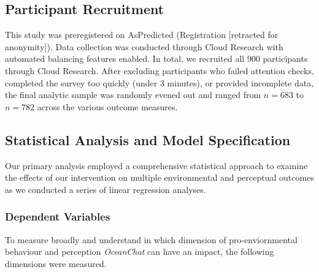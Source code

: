 \documentclass[sigconf, nonacm]{acmart}
\begin{document}
\subsection{Participant Recruitment}
This study was preregistered on AsPredicted (Registration [retracted for anonymity]). Data collection was conducted through Cloud Research with automated balancing features enabled. In total, we recruited all 900 participants through Cloud Research. After excluding participants who failed attention checks, completed the survey too quickly (under 3 minutes), or provided incomplete data, the final analytic sample was randomly evened out and ranged from $n=683$ to $n=782$ across the various outcome measures.

\subsection{Statistical Analysis and Model Specification}
Our primary analysis employed a comprehensive statistical approach to examine the effects of our intervention on multiple environmental and perceptual outcomes as we conducted a series of linear regression analyses.

\subsubsection{Dependent Variables}
To measure broadly and understand in which dimension of pro-enviornmental behaviour and perception \textit{OceanChat} can have an impact, the following dimensions were measured. 
\end{document}
